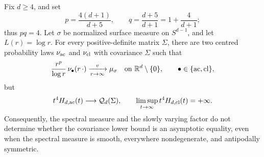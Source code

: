 \begin{theorem}
\label{thm:critical-vague-tail-nonidentifiability}
Fix \(d\ge4\), and set
\[
 p=\frac{4(d+1)}{d+5},\qquad
 q=\frac{d+5}{d+1}=1+\frac4{d+1};
\]
thus \(pq=4\).  Let \(\sigma\) be normalized surface measure on
\(S^{d-1}\), and let \(L(r)=\log r\).  For every positive-definite matrix
\(\Sigma\), there are two centred probability laws
\(\nu_{\rm ac}\) and \(\nu_{\rm cl}\) with covariance \(\Sigma\) such that
\begin{equation}\label{eq:critical-vague-tail-common-limit}
 \frac{r^p}{\log r}\,\nu_\bullet(r\,\mathord\cdot)
 \xrightarrow[r\to\infty]{v}\mu_\sigma
 \quad\text{on }\mathbb{R}^d\setminus\{0\},
 \qquad \bullet\in\{\mathrm{ac},\mathrm{cl}\},
\end{equation}
but
\begin{equation}\label{eq:critical-vague-tail-contrasting-entropy}
 t^4H_{d,{\rm ac}}(t)\longrightarrow\mathcal Q_d(\Sigma),
 \qquad
 \limsup_{t\to\infty}t^4H_{d,{\rm cl}}(t)=+\infty.
\end{equation}
Consequently, the spectral measure and the slowly varying factor do not
determine whether the covariance lower bound is an asymptotic equality,
even when the spectral measure is smooth, everywhere nondegenerate, and
antipodally symmetric.
\end{theorem}

